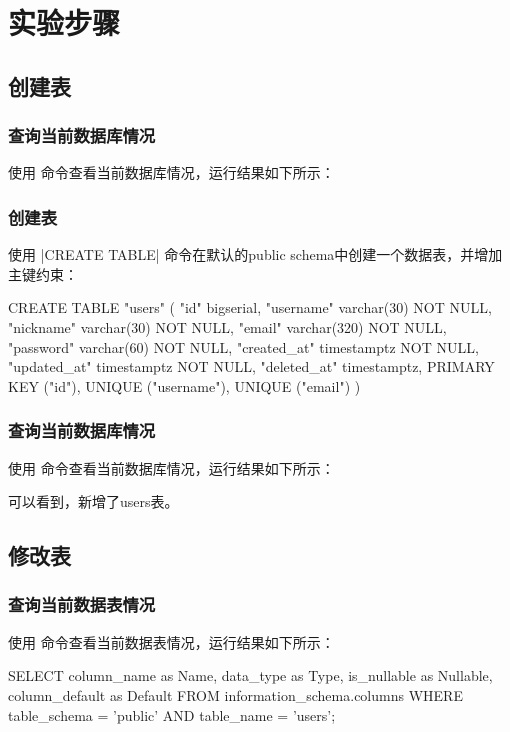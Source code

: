 \documentclass{ctexrep}
\begin{document}
\section{实验步骤}
\subsection{创建表}
\subsubsection{查询当前数据库情况}
使用 \sql{\dt} 命令查看当前数据库情况，运行结果如下所示：
\begin{run}
    \dt
\end{run}
\subsubsection{创建表}
使用 \sql|CREATE TABLE| 命令在默认的public schema中创建一个数据表，并增加主键约束：
\begin{run}
    CREATE TABLE "users" (
        "id" bigserial,
        "username" varchar(30) NOT NULL,
        "nickname" varchar(30) NOT NULL,
        "email" varchar(320) NOT NULL,
        "password" varchar(60) NOT NULL,
        "created_at" timestamptz NOT NULL,
        "updated_at" timestamptz NOT NULL,
        "deleted_at" timestamptz,
        PRIMARY KEY ("id"),
        UNIQUE ("username"),
        UNIQUE ("email")
    )
\end{run}
\subsubsection{查询当前数据库情况}
使用 \sql{\dt} 命令查看当前数据库情况，运行结果如下所示：
\begin{run}
    \dt
\end{run}
可以看到，新增了users表。
\subsection{修改表}
\subsubsection{查询当前数据表情况}
使用  命令查看当前数据表情况，运行结果如下所示：

\begin{run}
    SELECT column_name as Name, data_type as Type, is_nullable as Nullable, column_default as Default FROM information_schema.columns WHERE table_schema = 'public' AND table_name = 'users';
\end{run}
\end{document}
